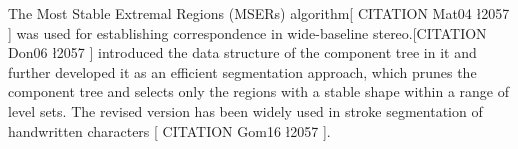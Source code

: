 The Most Stable Extremal Regions (MSERs) algorithm[ CITATION Mat04 \l 2057 ] was used for establishing correspondence in wide-baseline stereo.[CITATION Don06 \l 2057 ] introduced the data structure of the component tree in it and further developed it as an efficient segmentation approach, which prunes the component tree and selects only the regions with a stable shape within a range of level sets. The revised version has been widely used in stroke segmentation of handwritten characters [ CITATION Gom16 \l 2057 ].